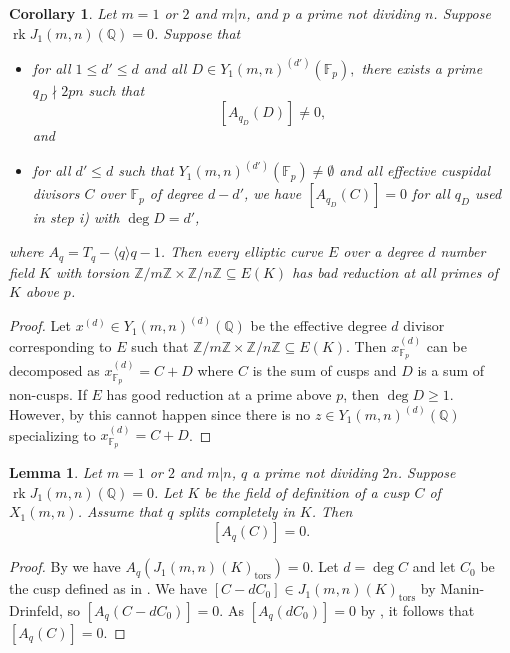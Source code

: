 \documentclass[11pt,reqno]{amsart}
\DeclareMathOperator{\rk}{rk}
\newtheorem{lemma}[theorem]{Lemma}
\newtheorem{corollary}[theorem]{Corollary}
\theoremstyle{definition}
\numberwithin{equation}{section}
\newcommand{\Q}{\mathbb{Q}}
\newcommand{\F}{\mathbb{F}}
\newcommand{\tor}{\mathrm{tors}}
\def\tg#1#2{\mathbb Z/#1\mathbb Z \times \mathbb Z /#2 \mathbb Z}
\newcommand{\diamondop}[1]{\langle #1 \rangle} %
\begin{document}
\begin{corollary} \label{cor:bad_reduction} Let $m=1$ or $2$ and $m|n$, and $p$ a prime not dividing $n$. Suppose $\rk J_1(m,n)(\Q)=0$. Suppose that
\begin{itemize}


    \item[i)] for all $1 \leq d'\leq d$ and all $D\in Y_1(m,n)^{(d')}(\F_p),$ there exists a prime $q_D\nmid 2pn$ such that  
    $$[A_{q_D}(D)]\neq 0,$$
    and

    \item[ii)] for all $d'\leq d$ such that $ Y_1(m,n)^{(d')}(\F_p)\neq \emptyset$ and all effective cuspidal divisors $C$ over $\F_p$ of degree $d-d'$, we have  $[A_{q_D}(C)]= 0$ for all $q_D$ used in step i) with $\deg D=d'$,
\end{itemize}
where $A_q=T_q-\diamondop{q}q-1$. Then every elliptic curve $E$ over a degree $d$ number field $K$ with torsion $\tg{m}{n}\subseteq E(K)$ has bad reduction at all primes of $K$ above $p$.
\end{corollary}
\begin{proof}
Let $x^{(d)}\in Y_1(m,n)^{(d)}(\Q)$ be the effective degree $d$ divisor corresponding to $E$ such that $\tg{m}{n}\subseteq E(K)$. Then $x^{(d)}_{\F_p}$ can be decomposed as $x^{(d)}_{\F_p}=C+D$ where $C$ is the sum of cusps and $D$ is a sum of non-cusps. If $E$ has good reduction at a prime above $p$, then $\deg D \geq  1$. However, by  this cannot happen since there is no $z \in Y_1(m,n)^{(d)}(\Q)$ specializing to $x^{(d)}_{\F_p}=C+D$.
\end{proof}

\begin{lemma} \label{lem:split_completely_cusp}
     Let $m=1$ or $2$ and $m|n$, $q$ a prime not dividing $2n$. Suppose $\rk J_1(m,n)(\Q)=0$. Let $K$ be the field of definition of a cusp $C$ of $X_1(m,n)$. Assume that $q$ splits completely in $K$. Then 
     $$[A_q(C)]=0.$$
     \end{lemma}
\begin{proof}
    By  we have $A_q(J_1(m,n)(K)_\tor)=0$. Let $d=\deg C$ and let $C_0$ be the cusp defined as in . We have $[C-dC_0]\in J_1(m,n)(K)_\tor$ by Manin-Drinfeld, so $[A_q(C-dC_0)]=0$. As $[A_q(dC_0)]=0$ by , it follows that $[A_q(C)]=0.$
\end{proof}
\end{document}
